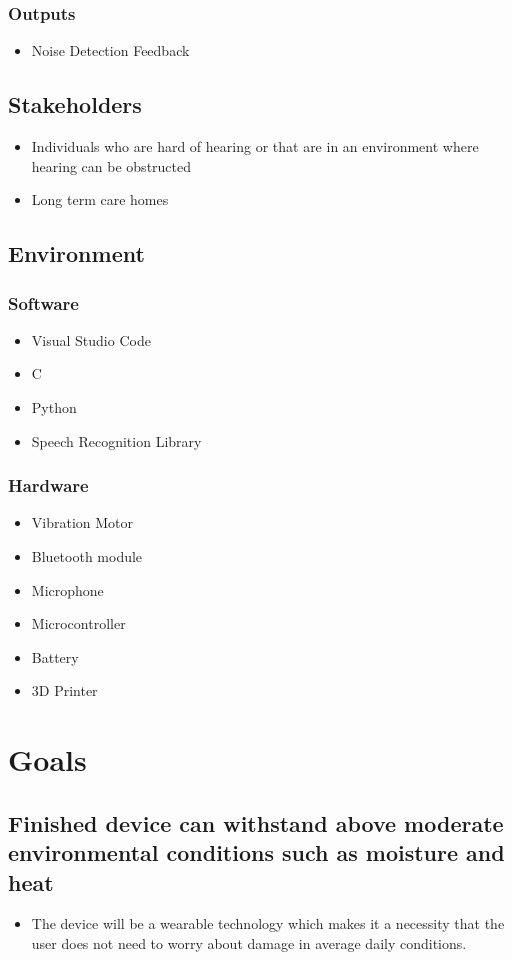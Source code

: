 \documentclass{article}
\begin{document}
\subsubsection {Outputs}
\begin{itemize}
    \item Noise Detection Feedback
\end{itemize}


\subsection{Stakeholders}
\begin{itemize}
    \item Individuals who are hard of hearing or that are in an environment where hearing can be obstructed
    \item Long term care homes
\end{itemize}

\subsection{Environment}
\subsubsection{Software}
\begin{itemize}
    \item Visual Studio Code
    \item C
    \item Python
    \item Speech Recognition Library
\end{itemize}
\subsubsection{Hardware}
\begin{itemize}
    \item Vibration Motor
    \item Bluetooth module
    \item Microphone
    \item Microcontroller
    \item Battery
    \item 3D Printer
\end{itemize}

\section{Goals}
\subsection{Finished device can withstand above moderate
environmental conditions such as moisture and
heat}
\begin{itemize}
    \item The device will be a wearable technology which makes it a necessity that the user does not need to worry about damage in average daily conditions.  
   \end{itemize} 
\end{document}
